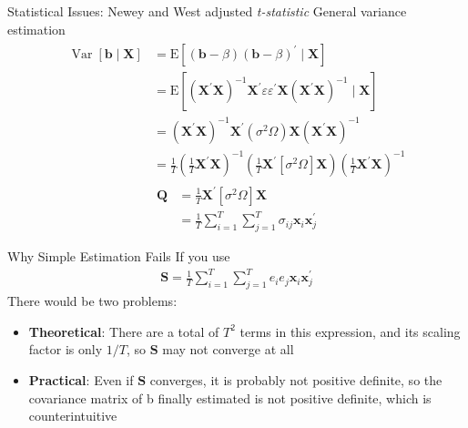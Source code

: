 \documentclass{beamer}
\begin{document}
\begin{frame}{Statistical Issues: Newey and West adjusted \textit{t-statistic}}
	General variance estimation
	\begin{align*}
		\begin{aligned}
			\operatorname{Var}[\mathbf{b} \mid \mathbf{X}]&=\mathrm{E}\left[(\mathbf{b}-\beta)(\mathbf{b}-\beta)^{\prime} \mid \mathbf{X}\right] \\
			&=\mathrm{E}\left[\left(\mathbf{X}^{\prime} \mathbf{X}\right)^{-1} \mathbf{X}^{\prime} \varepsilon \varepsilon^{\prime} \mathbf{X}\left(\mathbf{X}^{\prime} \mathbf{X}\right)^{-1} \mid \mathbf{X}\right] \\
			&=\left(\mathbf{X}^{\prime} \mathbf{X}\right)^{-1} \mathbf{X}^{\prime}\left(\sigma^{2} \Omega \right) \mathbf{X}\left(\mathbf{X}^{\prime} \mathbf{X}\right)^{-1} \\
			&=\frac{1}{T}\left(\frac{1}{T} \mathbf{X}^{\prime} \mathbf{X}\right)^{-1}\left(\frac{1}{T} \mathbf{X}^{\prime}\left[\sigma^{2} \Omega \right] \mathbf{X}\right)\left(\frac{1}{T} \mathbf{X}^{\prime} \mathbf{X}\right)^{-1}
		\end{aligned}
	\end{align*}
\begin{align*}
		\mathbf{Q} &=\frac{1}{T} \mathbf{X}^{\prime}\left[\sigma^{2}  \Omega \right] \mathbf{X} \\
		&=\frac{1}{T} \sum_{i=1}^{T} \sum_{j=1}^{T} \sigma_{i j} \mathbf{x}_{i} \mathbf{x}_{j}^{\prime}
\end{align*}
\end{frame}

\begin{frame}{Why Simple Estimation Fails}
	If you use 
	\begin{align*}
	\mathbf{S} =\frac{1}{T} \sum_{i=1}^{T} \sum_{j=1}^{T} e_{i} e_{j} \mathbf{x}_{i} \mathbf{x}_{j}^{\prime}	
	\end{align*}
There would be two problems:
\begin{itemize}
	\item \textbf{Theoretical}: There are a total of $ T^2 $ terms in this expression, and its scaling factor is only $ 1/T $, so $ \mathbf{S} $ may not converge at all
	\item \textbf{Practical}: Even if $ \mathbf{S} $ converges, it is probably not positive definite, so the covariance matrix of b finally estimated is not positive definite, which is counterintuitive
\end{itemize}
\end{frame}
\end{document}
